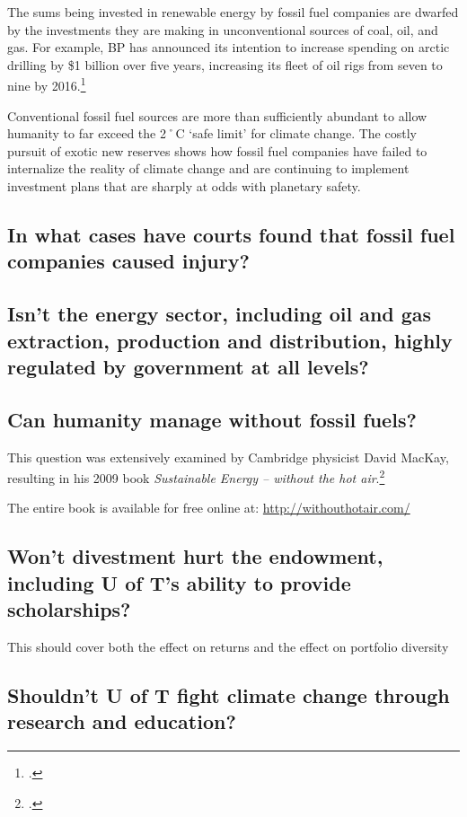 The sums being invested in renewable energy by fossil fuel companies are dwarfed by the investments they are making in unconventional sources of coal, oil, and gas.
For example, BP has announced its intention to increase spending on arctic drilling by \$1 billion over five years, increasing its fleet of oil rigs from seven to nine by 2016.\footcite[][]{BPArcticBillion}



Conventional fossil fuel sources are more than sufficiently abundant to allow humanity to far exceed the 2˚C `safe limit' for climate change.
The costly pursuit of exotic new reserves shows how fossil fuel companies have failed to internalize the reality of climate change and are continuing to implement investment plans that are sharply at odds with planetary safety.

	
	
	\subsection{In what cases have courts found that fossil fuel companies caused injury?}
	
	
	
	\subsection{Isn't the energy sector, including oil and gas extraction, production and distribution, highly regulated by government at all levels?}
	
	
	
	\subsection{Can humanity manage without fossil fuels?}
	


This question was extensively examined by Cambridge physicist David MacKay, resulting in his 2009 book \emph{Sustainable Energy – without the hot air}.\footcite[][]{MacKay2009}


The entire book is available for free online at: \url{http://withouthotair.com/}


	\subsection{Won't divestment hurt the endowment, including U of T's ability to provide scholarships?}
	
	
\begin{vcom}
	This should cover both the effect on returns and the effect on portfolio diversity
\end{vcom}



	\subsection{Shouldn't U of T fight climate change through research and education?}



